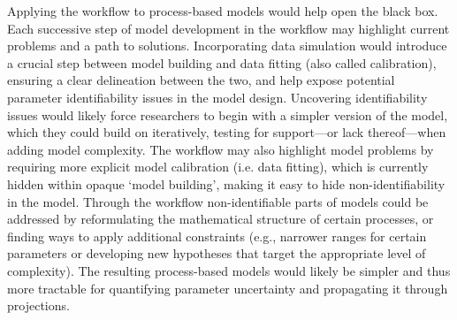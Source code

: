 \documentclass[11pt]{article}
\begin{document}
Applying the workflow to process-based models would help open the black box.
Each successive step of model development in the workflow may highlight current problems and a path to solutions. Incorporating data simulation would introduce a crucial step between model building and data fitting (also called calibration), ensuring a clear delineation between the two, and help expose potential parameter identifiability issues in the model design. 
Uncovering identifiability issues would likely force researchers to begin with a simpler version of the model, which they could build on iteratively, testing for support---or lack thereof---when adding model complexity. The workflow may also highlight model problems by requiring more explicit model calibration (i.e. data fitting), which is currently hidden within opaque `model building', making it easy to hide non-identifiability in the model. Through the workflow non-identifiable parts of models could be addressed by reformulating the mathematical structure of certain processes, or finding ways to apply additional constraints (e.g., narrower ranges for certain parameters or developing new hypotheses that target the appropriate level of complexity). The resulting process-based models would likely be simpler and thus more tractable for quantifying parameter uncertainty and propagating it through projections. 
\end{document}
